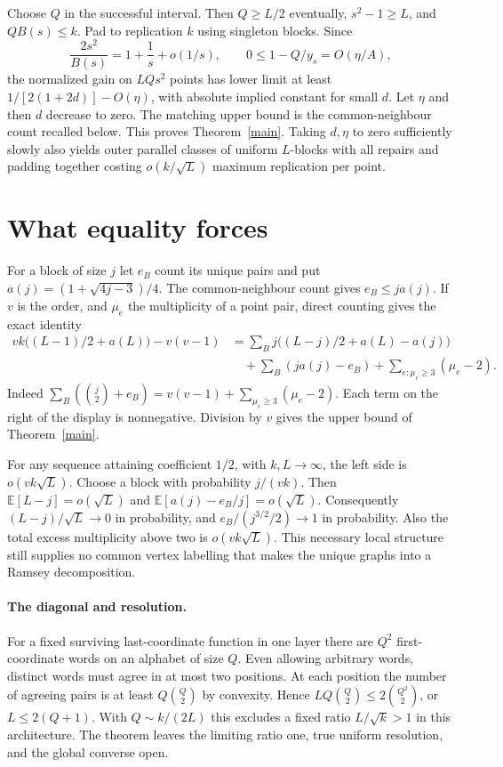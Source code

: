 \documentclass[10pt]{article}
\begin{document}
Choose $Q$ in the successful interval. Then $Q\ge L/2$ eventually, $s^2-1\ge L$, and $QB(s)\le k$. Pad to replication $k$ using singleton blocks. Since
\[
 \frac{2s^2}{B(s)}=1+\frac1s+o(1/s),
 \qquad 0\le1-Q/y_s=O(\eta/A),
\]
the normalized gain on $LQs^2$ points has lower limit at least $1/[2(1+2d)]-O(\eta)$, with absolute implied constant for small $d$. Let $\eta$ and then $d$ decrease to zero. The matching upper bound is the common-neighbour count recalled below. This proves Theorem~\ref{main}. Taking $d,\eta$ to zero sufficiently slowly also yields outer parallel classes of uniform $L$-blocks with all repairs and padding together costing $o(k/\sqrt L)$ maximum replication per point.

\section{What equality forces}
For a block of size $j$ let $e_B$ count its unique pairs and put $a(j)=(1+\sqrt{4j-3})/4$. The common-neighbour count gives $e_B\le ja(j)$. If $v$ is the order, and $\mu_e$ the multiplicity of a point pair, direct counting gives the exact identity
\begin{align*}
 vk\big((L-1)/2+a(L)\big)-v(v-1)
  &=\sum_B j\big((L-j)/2+a(L)-a(j)\big)\\
  &\quad+\sum_B(ja(j)-e_B)+\sum_{e:\mu_e\ge3}(\mu_e-2).
\end{align*}
Indeed $\sum_B(\binom j2+e_B)=v(v-1)+\sum_{\mu_e\ge3}(\mu_e-2)$. Each term on the right of the display is nonnegative. Division by $v$ gives the upper bound of Theorem~\ref{main}.

For any sequence attaining coefficient $1/2$, with $k,L\to\infty$, the left side is $o(vk\sqrt L)$. Choose a block with probability $j/(vk)$. Then $\mathbb E[L-j]=o(\sqrt L)$ and $\mathbb E[a(j)-e_B/j]=o(\sqrt L)$. Consequently $(L-j)/\sqrt L\to0$ in probability, and $e_B/(j^{3/2}/2)\to1$ in probability. Also the total excess multiplicity above two is $o(vk\sqrt L)$. This necessary local structure still supplies no common vertex labelling that makes the unique graphs into a Ramsey decomposition.

\paragraph{The diagonal and resolution.}
For a fixed surviving last-coordinate function in one layer there are $Q^2$ first-coordinate words on an alphabet of size $Q$. Even allowing arbitrary words, distinct words must agree in at most two positions. At each position the number of agreeing pairs is at least $Q\binom Q2$ by convexity. Hence $LQ\binom Q2\le2\binom{Q^2}2$, or $L\le2(Q+1)$. With $Q\sim k/(2L)$ this excludes a fixed ratio $L/\sqrt k>1$ in this architecture. The theorem leaves the limiting ratio one, true uniform resolution, and the global converse open.
\end{document}
